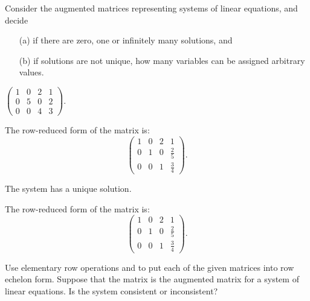 \documentclass{ximera}
\begin{document}
\problemlabel

\noindent Consider the augmented matrices representing systems of linear equations, and decide \begin{itemize} \item[(a)] if there are zero, one or infinitely many solutions, and \item[(b)] if solutions are not unique, how many variables can be assigned arbitrary values. \end{itemize}

\begin{exercise} \label{c2.3.11c}
$\left(\begin{array}{ccc|c}  1 & 0 & 2 & 1\\ 0 & 5 & 0 & 2 \\ 0 & 0 & 4 & 3
       \end{array}\right)$.
     \begin{multipleChoice}
     \end{multipleChoice}
     \begin{hint}
       The row-reduced form of the matrix is:
\[
\left(\begin{array}{rrr|r} 1 & 0 & 2 & 1 \\ 0 & 1 & 0 & \frac{2}{5}
\\ 0 & 0 & 1 & \frac{3}{4}\end{array}\right).
\]
     \end{hint}

\begin{solution}

\ans The system has a unique solution.

\soln The row-reduced form of the matrix is:
\[
\left(\begin{array}{rrr|r} 1 & 0 & 2 & 1 \\ 0 & 1 & 0 & \frac{2}{5}
\\ 0 & 0 & 1 & \frac{3}{4}\end{array}\right).
\]

\end{solution}
\end{exercise}

\matlabproblemlabel

\noindent Use elementary row operations and \Matlab to put each of the given matrices into row echelon form.  Suppose that the matrix is the augmented matrix for a system of linear equations.  Is the system consistent or inconsistent?
\end{document}
